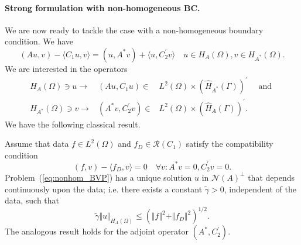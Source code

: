 \paragraph*{Strong formulation with non-homogeneous BC.}


We are now ready to tackle the case with a non-homogeneous boundary
condition. We have
\[ (Au,v) - \langle C_1 u,v\rangle = (u,A^\ast v) +
\langle u,C_2^\prime v\rangle \quad u \in H_A(\Omega), v \in H_{A^\ast}(\Omega) .
\]
We are interested in the operators 
\[
\begin{array}{rrl}
H_A(\Omega) \ni u \to & (Au,C_1 u) \in & L^2(\Omega) \times (\widehat{H}_{A^\ast}(\Gamma))^\prime \quad \text{ and } \\[8pt]
H_{A^\ast}(\Omega) \ni v \to & (A^\ast v,C_2^\prime v) \in & L^2(\Omega) \times (\widehat{H}_{A}(\Gamma))^\prime.
\end{array}
\label{eq:bounded_below_nhom}
\]
We have the following classical result.
\begin{theorem}
Assume
that data $f \in L^2(\Omega)$ and 
$f_D \in \mathcal{R}(C_1)$ satisfy the compatibility condition
\[
(f,v) - \langle f_D,v\rangle = 0 \quad \forall v : A^\ast v = 0, C_2^\prime v = 0.
\]
Problem~(\ref{eq:nonhom_BVP}) has a unique solution $u$ in $\mathcal{N}(A)^\perp$ that depends
continuously upon the data; i.e. there exists a constant $\tilde{\gamma}>0$, independent of the data, such that
\[
\tilde{\gamma} \Vert u \Vert_{H_A(\Omega)} \leq \left( \Vert f \Vert^2 + \Vert  f_D \Vert^2 \right)^{1/2}.
\]
The analogous result holds for the adjoint operator $(A^\ast, C_2^\prime)$.
\label{theorem:strong_nonhom_formulation}
\end{theorem}
